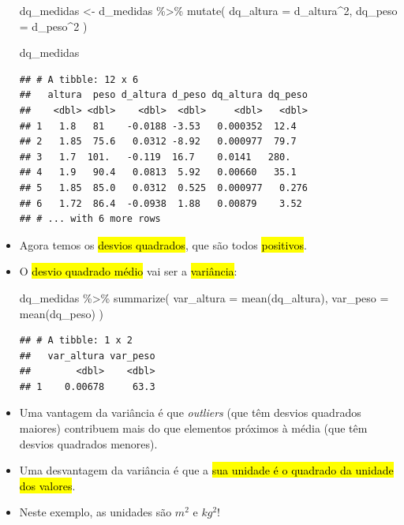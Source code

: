 \documentclass[
  11pt]{report}
\newenvironment{Shaded}{\begin{snugshade}}{\end{snugshade}}
\newcommand{\AttributeTok}[1]{\textcolor[rgb]{0.77,0.63,0.00}{#1}}
\newcommand{\DecValTok}[1]{\textcolor[rgb]{0.00,0.00,0.81}{#1}}
\newcommand{\FunctionTok}[1]{\textcolor[rgb]{0.00,0.00,0.00}{#1}}
\newcommand{\NormalTok}[1]{#1}
\newcommand{\OtherTok}[1]{\textcolor[rgb]{0.56,0.35,0.01}{#1}}
\newcommand{\SpecialCharTok}[1]{\textcolor[rgb]{0.00,0.00,0.00}{#1}}
\renewenvironment{Shaded}{
    \begin{mdframed}[%
      roundcorner=2pt,%
      innerleftmargin=5pt,%
      innerrightmargin=5pt,%
      topline=true,%
      leftline=true,%
      rightline=true,%
      bottomline=true,%
      linewidth=0.5pt,%
      linecolor=black!20,%
      backgroundcolor=black!2,%
      skipabove=2ex,%
      skipbelow=2.5ex%
    ]%
  }
  {
    \end{mdframed}
  }
\begin{document}
\begin{itemize}
\begin{Shaded}
\begin{Highlighting}[]
\NormalTok{dq\_medidas }\OtherTok{\textless{}{-}}\NormalTok{ d\_medidas }\SpecialCharTok{\%\textgreater{}\%} 
  \FunctionTok{mutate}\NormalTok{(}
    \AttributeTok{dq\_altura =}\NormalTok{ d\_altura}\SpecialCharTok{\^{}}\DecValTok{2}\NormalTok{,}
    \AttributeTok{dq\_peso =}\NormalTok{ d\_peso}\SpecialCharTok{\^{}}\DecValTok{2}
\NormalTok{  )}

\NormalTok{dq\_medidas}
\end{Highlighting}
\end{Shaded}

\begin{verbatim}
## # A tibble: 12 x 6
##   altura  peso d_altura d_peso dq_altura dq_peso
##    <dbl> <dbl>    <dbl>  <dbl>     <dbl>   <dbl>
## 1   1.8   81    -0.0188 -3.53   0.000352  12.4  
## 2   1.85  75.6   0.0312 -8.92   0.000977  79.7  
## 3   1.7  101.   -0.119  16.7    0.0141   280.   
## 4   1.9   90.4   0.0813  5.92   0.00660   35.1  
## 5   1.85  85.0   0.0312  0.525  0.000977   0.276
## 6   1.72  86.4  -0.0938  1.88   0.00879    3.52 
## # ... with 6 more rows
\end{verbatim}
\item
  Agora temos os {\hl{desvios quadrados}}, que são todos {\hl{positivos}}.
\item
  O {\hl{desvio quadrado médio}} vai ser a {\hl{variância}}:

\begin{Shaded}
\begin{Highlighting}[]
\NormalTok{dq\_medidas }\SpecialCharTok{\%\textgreater{}\%} 
  \FunctionTok{summarize}\NormalTok{(}
    \AttributeTok{var\_altura =} \FunctionTok{mean}\NormalTok{(dq\_altura),}
    \AttributeTok{var\_peso =} \FunctionTok{mean}\NormalTok{(dq\_peso)}
\NormalTok{  )}
\end{Highlighting}
\end{Shaded}

\begin{verbatim}
## # A tibble: 1 x 2
##   var_altura var_peso
##        <dbl>    <dbl>
## 1    0.00678     63.3
\end{verbatim}
\item
  Uma vantagem da variância é que \emph{outliers} (que têm desvios quadrados maiores) contribuem mais do que elementos próximos à média (que têm desvios quadrados menores).
\item
  Uma desvantagem da variância é que a {\hl{sua unidade é o quadrado da unidade dos valores}}.
\item
  Neste exemplo, as unidades são $m^2$ e $kg^2$!
\end{itemize}
\end{document}
